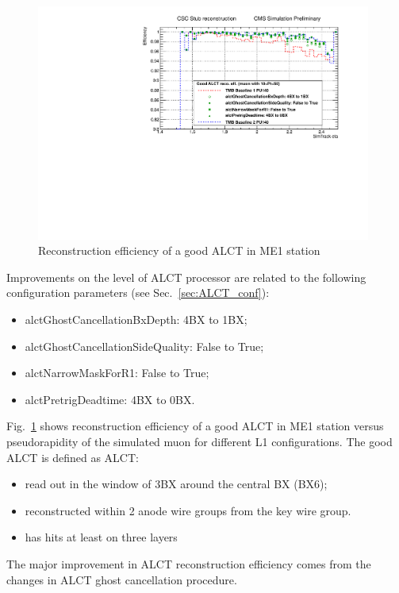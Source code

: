 \begin{figure}[htb]
\includegraphics[width=0.98\textwidth]{figures/ALCT_improvements_ALCT_recoEff.pdf}
\caption{Reconstruction efficiency of a good ALCT in ME1 station}
\label{fig:ALCT_improvements_ALCT_recoEff}
\end{figure}

Improvements on the level of ALCT processor are related to the following configuration parameters (see Sec.~\ref{sec:ALCT_conf}):
\begin{itemize}
	\item alctGhostCancellationBxDepth: 4BX to 1BX;
	\item alctGhostCancellationSideQuality: False to True;
	\item alctNarrowMaskForR1: False to True;
	\item alctPretrigDeadtime: 4BX to 0BX.
\end{itemize}

Fig.~\ref{fig:ALCT_improvements_ALCT_recoEff} shows reconstruction efficiency of a good ALCT in ME1 station versus pseudorapidity of the simulated muon for different L1 configurations. The good ALCT is defined as ALCT:
\begin{itemize}
	\item read out in the window of 3BX around the central BX (BX6);
	\item reconstructed within 2 anode wire groups from the key wire group.
	\item has hits at least on three layers
\end{itemize}

The major improvement in ALCT reconstruction efficiency comes from the changes in ALCT ghost cancellation procedure.

